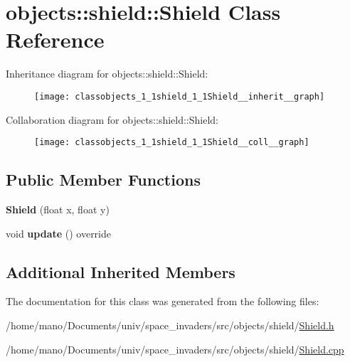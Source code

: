 \hypertarget{classobjects_1_1shield_1_1Shield}{}\section{objects\+:\+:shield\+:\+:Shield Class Reference}
\label{classobjects_1_1shield_1_1Shield}


Inheritance diagram for objects\+:\+:shield\+:\+:Shield\+:\nopagebreak
\begin{figure}[H]
\begin{center}
\leavevmode
\texttt{[image: classobjects\_1\_1shield\_1\_1Shield\_\_inherit\_\_graph]}
\end{center}
\end{figure}


Collaboration diagram for objects\+:\+:shield\+:\+:Shield\+:\nopagebreak
\begin{figure}[H]
\begin{center}
\leavevmode
\texttt{[image: classobjects\_1\_1shield\_1\_1Shield\_\_coll\_\_graph]}
\end{center}
\end{figure}
\subsection*{Public Member Functions}
\begin{DoxyCompactItemize}
\item 
\mbox{\label{classobjects_1_1shield_1_1Shield_a2fcfb95c4bca077c3d284538bbdf4559}}
{\bfseries Shield} (float x, float y)
\item 
\mbox{\label{classobjects_1_1shield_1_1Shield_a78b754cf93dea3796d144d9eca664d69}}
void {\bfseries update} () override
\end{DoxyCompactItemize}
\subsection*{Additional Inherited Members}


The documentation for this class was generated from the following files\+:\begin{DoxyCompactItemize}
\item 
/home/mano/\+Documents/univ/space\+\_\+invaders/src/objects/shield/\hyperlink{Shield_8h}{Shield.\+h}\item
/home/mano/\+Documents/univ/space\+\_\+invaders/src/objects/shield/\hyperlink{Shield_8cpp}{Shield.\+cpp}\end{DoxyCompactItemize}
